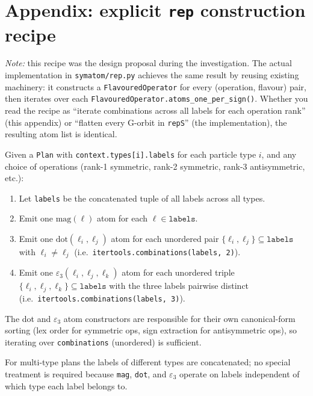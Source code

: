 \documentclass[a4paper,11pt]{article}
\begin{document}
\label{sec:rep-construction}
\section*{Appendix: explicit \texttt{rep} construction recipe}

\noindent
\emph{Note:} this recipe was the design proposal during the
investigation.  The actual implementation in
\texttt{symatom/rep.py} achieves the same result by reusing existing
machinery: it constructs a \texttt{FlavouredOperator} for every
(operation, flavour) pair, then iterates over each
\texttt{FlavouredOperator.atoms\_one\_per\_sign()}.  Whether you read
the recipe as ``iterate combinations across all labels for each
operation rank'' (this appendix) or ``flatten every G-orbit in
\texttt{repS}'' (the implementation), the resulting atom list is
identical.

\bigskip
\noindent
Given a \texttt{Plan} with \texttt{context.types[i].labels} for each
particle type $i$, and any choice of operations (rank-1 symmetric,
rank-2 symmetric, rank-3 antisymmetric, etc.):

\begin{enumerate}[nosep]
  \item Let \texttt{labels} be the concatenated tuple of all labels
        across all types.
  \item Emit one $\text{mag}(\ell)$ atom for each $\ell \in
        \texttt{labels}$.
  \item Emit one $\text{dot}(\ell_i, \ell_j)$ atom for each unordered
        pair $\{\ell_i, \ell_j\} \subseteq \texttt{labels}$ with
        $\ell_i \neq \ell_j$
        (i.e.\ \texttt{itertools.combinations(labels, 2)}).
  \item Emit one $\varepsilon_3(\ell_i, \ell_j, \ell_k)$ atom for each
        unordered triple $\{\ell_i, \ell_j, \ell_k\} \subseteq
        \texttt{labels}$ with the three labels pairwise distinct
        (i.e.\ \texttt{itertools.combinations(labels, 3)}).
\end{enumerate}

\noindent
The dot and $\varepsilon_3$ atom constructors are responsible for
their own canonical-form sorting (lex order for symmetric ops, sign
extraction for antisymmetric ops), so iterating over
\texttt{combinations} (unordered) is sufficient.

For multi-type plans the labels of different types are concatenated;
no special treatment is required because \texttt{mag}, \texttt{dot},
and $\varepsilon_3$ operate on labels independent of which type each
label belongs to.
\end{document}
